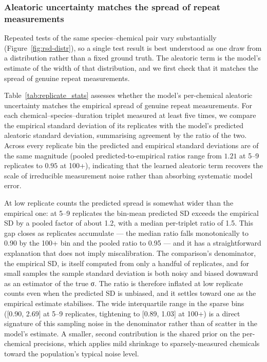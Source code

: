 \subsubsection{Aleatoric uncertainty matches the spread of repeat measurements}

Repeated tests of the same species--chemical pair vary substantially (Figure~\ref{fig:rsd-distr}), so a single test result is best understood as one draw from a distribution rather than a fixed ground truth. The aleatoric term is the model's estimate of the width of that distribution, and we first check that it matches the spread of genuine repeat measurements.

Table~\ref{tab:replicate_stats} assesses whether the model's per-chemical aleatoric
uncertainty matches the empirical spread of genuine repeat measurements. For each
chemical--species--duration triplet measured at least five times, we compare the
empirical standard deviation of its replicates with the model's predicted aleatoric
standard deviation, summarising agreement by the ratio of the two. Across every
replicate bin the predicted and empirical standard deviations are of the same magnitude
(pooled predicted-to-empirical ratios range from $1.21$ at 5--9 replicates to $0.95$ at
100+), indicating that the learned aleatoric term recovers the scale of irreducible
measurement noise rather than absorbing systematic model error.

At low replicate counts the predicted spread is somewhat wider than the empirical one: at 5–9 replicates the bin-mean predicted SD exceeds the empirical SD by a pooled factor of about 1.2, with a median per-triplet ratio of 1.5. This gap closes as replicates accumulate — the median ratio falls monotonically to 0.90 by the 100+ bin and the pooled ratio to 0.95 — and it has a straightforward explanation that does not imply miscalibration. The comparison's denominator, the empirical SD, is itself computed from only a handful of replicates, and for small samples the sample standard deviation is both noisy and biased downward as an estimator of the true σ. The ratio is therefore inflated at low replicate counts even when the predicted SD is unbiased, and it settles toward one as the empirical estimate stabilises. The wide interquartile range in the sparse bins ([0.90, 2.69] at 5–9 replicates, tightening to [0.89, 1.03] at 100+) is a direct signature of this sampling noise in the denominator rather than of scatter in the model's estimate. A smaller, second contribution is the shared prior on the per-chemical precisions, which applies mild shrinkage to sparsely-measured chemicals toward the population's typical noise level.


